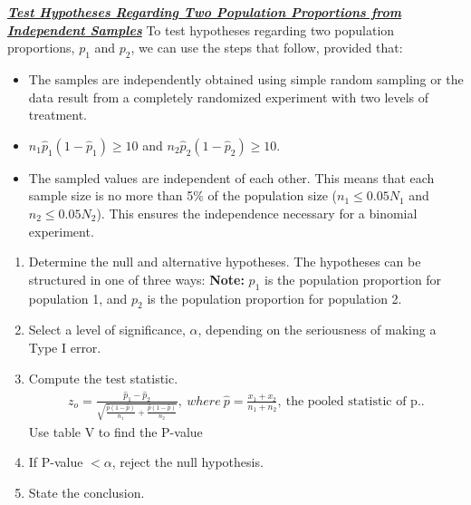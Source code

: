 \documentclass{report}
\begin{document}
    \pagebreak \bigbreak \noindent 
    \textbf{\textit{\underline{Test Hypotheses Regarding Two Population Proportions from Independent Samples}}}
    \bigbreak \noindent 
    To test hypotheses regarding two population proportions, \(p_1\) and \(p_2\), we can use the steps that follow, provided that:
    \begin{itemize}
        \item The samples are independently obtained using simple random sampling or the data result from a completely randomized experiment with two levels of treatment.
        \item \(n_1\hat{p}_1(1-\hat{p}_1) \geq 10\) and \(n_2\hat{p}_2(1-\hat{p}_2) \geq 10\).
        \item The sampled values are independent of each other. This means that each sample size is no more than 5\% of the population size (\(n_1 \leq 0.05N_1\) and \(n_2 \leq 0.05N_2\)). This ensures the independence necessary for a binomial experiment.
    \end{itemize}
    \bigbreak \noindent 
    \begin{enumerate}
        \item Determine the null and alternative hypotheses. The hypotheses can be structured in one of three ways:
            \textbf{Note:} $p_{1}$  is the population proportion for population 1, and $p_{2}$ is the population proportion for population 2.
        \item  Select a level of significance, $\alpha$, depending on the seriousness of making a Type I error.
        \item Compute the test statistic.
            \begin{align*}
                z_o = \frac{\hat{p}_1 - \hat{p}_2}{\sqrt{\frac{\hat{p}(1-\hat{p})}{n_1} + \frac{\hat{p}(1-\hat{p})}{n_2}}},\ where\ \hat{p} = \frac{x_1 + x_2}{n_1 + n_2},\ \text{the pooled statistic of p.}
            .\end{align*}
            Use table V to find the P-value
        \item If P-value $< \alpha$, reject the null hypothesis.
        \item State the conclusion.
    \end{enumerate}
\end{document}
